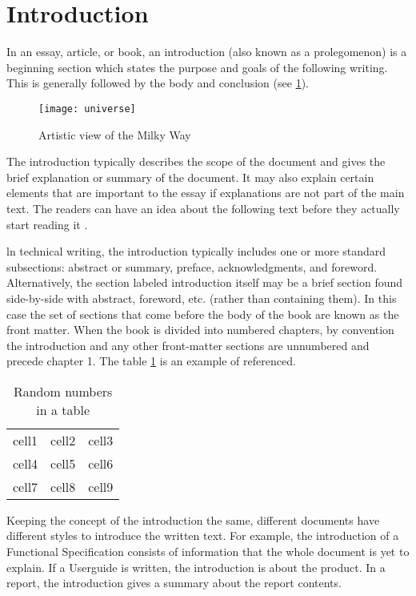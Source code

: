 \section{Introduction}
In an essay, article, or book, an introduction (also known as a prolegomenon) is a beginning section which states the purpose and goals of the following writing. This is generally followed by the body and conclusion (see \ref{fig:uni}).

\begin{figure}[h]
    \centering
    \texttt{[image: universe]}
    \caption{Artistic view of the Milky Way}
    \label{fig:uni}
\end{figure}

The introduction typically describes the scope of the document and gives the brief explanation or summary of the document. It may also explain certain elements that are important to the essay if explanations are not part of the main text. The readers can have an idea about the following text before they actually start reading it \cite{heiermann2005numerical}.

ln technical writing, the introduction typically includes one or more standard subsections: abstract or summary, preface, acknowledgments, and foreword. Alternatively, the section labeled introduction itself may be a brief section found side-by-side with abstract, foreword, etc. (rather than containing them). In this case the set of sections that come before the body of the book are known as the front matter. When the book is divided into numbered chapters, by convention the introduction and any other front-matter sections are unnumbered and precede chapter 1. The table \ref{table:1} is an example of referenced.

\begin{table}
    \begin{center}
    \caption{Random numbers in a table}
    \begin{tabular}{ c c c }
     cell1 & cell2 & cell3 \\ 
     cell4 & cell5 & cell6 \\  
     cell7 & cell8 & cell9    
    \end{tabular}
    \label{table:1}
    \end{center}
\end{table}

Keeping the concept of the introduction the same, different documents have different styles to introduce the written text. For example, the introduction of a Functional Specification consists of information that the whole document is yet to explain. If a Userguide is written, the introduction is about the product. In a report, the introduction gives a summary about the report contents.


